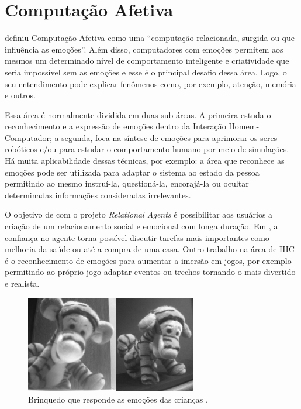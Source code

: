 \section{Computação Afetiva}

\citet{Pic98} definiu Computação Afetiva como uma ``computação relacionada,
surgida ou que influência as emoções''. Além disso, computadores com emoções
permitem aos mesmos um determinado nível de comportamento inteligente e
criatividade que seria impossível sem as emoções e esse é o principal desafio
dessa área. Logo, o seu entendimento pode explicar fenômenos como, por
exemplo, atenção, memória e outros.


Essa área é normalmente dividida em duas sub-áreas. A primeira estuda o
reconhecimento e a expressão de emoções dentro da Interação Homem-Computador;
a segunda, foca na síntese de emoções para aprimorar os seres robóticos e/ou
para estudar o comportamento humano por meio de simulações. Há muita
aplicabilidade dessas técnicas, por exemplo: a área que reconhece as emoções
pode ser utilizada para adaptar o sistema ao estado da pessoa permitindo ao
mesmo instruí-la, questioná-la, encorajá-la ou ocultar determinadas
informações consideradas irrelevantes.

O objetivo de \citet{bick2003relational} com o projeto \emph{Relational
Agents} é possibilitar aos usuários a criação de um relacionamento social e
emocional com longa duração.  Em \citet{bickmore2009virtual}, a confiança no
agente torna possível discutir tarefas mais importantes como melhoria da saúde
ou até a compra de uma casa. Outro trabalho na área de IHC é o reconhecimento
de emoções para aumentar a imersão em jogos, por exemplo permitindo ao próprio
jogo adaptar eventos ou trechos tornando-o mais divertido e realista.

\begin{figure}
  \begin{center}
    \includegraphics[width=75mm]{figuras/tigger-mit.png}
  \end{center}
  \caption{Brinquedo que responde as emoções das crianças \cite{kirsch1999affective}.}
  \label{fig:tigger-mit}
\end{figure}

